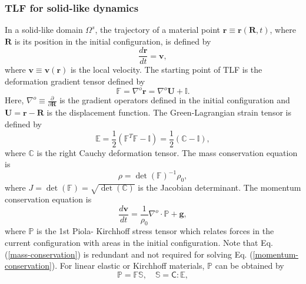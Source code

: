 \documentclass[12pt, a4paper,onecolumn]{article}
\begin{document}
\subsubsection{TLF for solid-like dynamics}  
In a solid-like domain $\Omega^{s}$, the trajectory of a material point 
$\mathbf{r} \equiv \mathbf{r}(\mathbf{R},t)$, 
where $\mathbf{R}$ is its position in the initial configuration, is defined by
%
\begin{equation}\label{trajectory}
\frac{d \mathbf{r}}{d t}  =  \mathbf{v},
\end{equation}
%
where $\mathbf{v}\equiv\mathbf{v}(\mathbf{r})$ is the local velocity.
The starting point of TLF is the deformation gradient tensor defined by 
%
\begin{equation}\label{deformation-tensor}
\mathbb{F}  =  \nabla^{o} \mathbf{r} = \nabla^{o} \mathbf{U}  + \mathbb{I}.
\end{equation}
%
Here, $\nabla^{o} \equiv \frac{\partial}{\partial \mathbf{R}}$ 
is the gradient operators defined in the initial configuration 
and $\mathbf{U} = \mathbf{r} - \mathbf{R}$ is the displacement function.
The Green-Lagrangian strain tensor is defined by 
%
\begin{equation}\label{Lagrangian-strain}
\mathbb{E}  = \frac{1}{2} \left(\mathbb{F}^{T}\mathbb{F} - \mathbb{I}\right) = \frac{1}{2} \left(\mathbb{C} - \mathbb{I}\right),
\end{equation}
%
where $\mathbb{C}$ is the right Cauchy deformation tensor.
The mass conservation equation is 
%
\begin{equation}\label{mass-conservation}
\rho  =  \det(\mathbb{F})^{-1}\rho_0,
\end{equation}
%
where $J = \det(\mathbb{F}) = \sqrt{\det(\mathbb{C})}$ is the Jacobian determinant. 
The momentum conservation equation is 
%
\begin{equation}\label{momentum-conservation}
\frac{d \mathbf{v}}{d t}  = \frac{1}{\rho_0}\nabla^{o} \cdot \mathbb{P} + \mathbf{g},
\end{equation}
%
where $\mathbb{P}$ is the 1st Piola- Kirchhoff stress tensor 
which relates forces in the current configuration with areas in the initial configuration.
Note that Eq. (\ref{mass-conservation}) is redundant and not required for solving Eq. (\ref{momentum-conservation}). 
For linear elastic or Kirchhoff materials, $\mathbb{P}$ can be obtained by 
%
\begin{equation}\label{linear-elasticity}
\mathbb{P} = \mathbb{F} \mathbb{S}, \quad \mathbb{S}  = \boldsymbol{\mathsf{C}}:\mathbb{E} ,
\end{equation}
\end{document}
